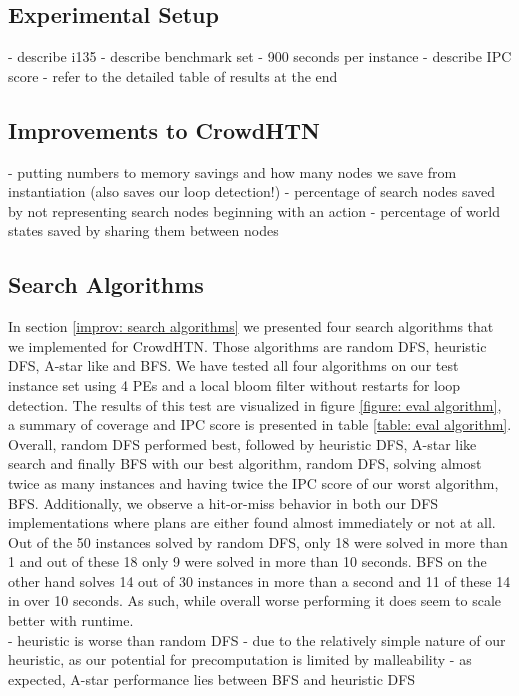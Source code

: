 \subsection{Experimental Setup}
- describe i135
- describe benchmark set
- 900 seconds per instance
- describe IPC score
- refer to the detailed table of results at the end

\subsection{Improvements to CrowdHTN}
- putting numbers to memory savings and how many nodes we save from instantiation (also saves our loop detection!)
- percentage of search nodes saved by not representing search nodes beginning with an action
- percentage of world states saved by sharing them between nodes

\subsection{Search Algorithms}
In section \ref{improv: search algorithms} we presented four search algorithms that we implemented for CrowdHTN. Those algorithms are random DFS, heuristic DFS, A-star like and BFS. We have tested all four algorithms on our test instance set using 4 PEs and a local bloom filter without restarts for loop detection. The results of this test are visualized in figure \ref{figure: eval algorithm}, a summary of coverage and IPC score is presented in table \ref{table: eval algorithm}. \\
Overall, random DFS performed best, followed by heuristic DFS, A-star like search and finally BFS with our best algorithm, random DFS, solving almost twice as many instances and having twice the IPC score of our worst algorithm, BFS. Additionally, we observe a hit-or-miss behavior in both our DFS implementations where plans are either found almost immediately or not at all. Out of the 50 instances solved by random DFS, only 18 were solved in more than 1 and out of these 18 only 9 were solved in more than 10 seconds. BFS on the other hand solves 14 out of 30 instances in more than a second and 11 of these 14 in over 10 seconds. As such, while overall worse performing it does seem to scale better with runtime. \\
- heuristic is worse than random DFS
- due to the relatively simple nature of our heuristic, as our potential for precomputation is limited by malleability
- as expected, A-star performance lies between BFS and heuristic DFS

